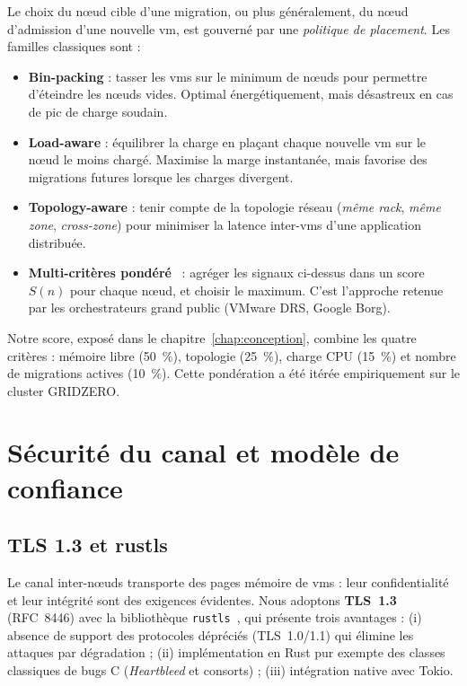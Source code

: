 Le choix du nœud cible d'une migration, ou plus généralement, du nœud d'admission d'une nouvelle \acrshort{vm}, est gouverné par une \emph{politique de placement}. Les familles classiques sont :

\begin{itemize}[leftmargin=*]
    \item \textbf{Bin-packing} : tasser les \acrshort{vm}s sur le minimum de nœuds pour permettre d'éteindre les nœuds vides. Optimal énergétiquement, mais désastreux en cas de pic de charge soudain.
    \item \textbf{Load-aware} : équilibrer la charge en plaçant chaque nouvelle \acrshort{vm} sur le nœud le moins chargé. Maximise la marge instantanée, mais favorise des migrations futures lorsque les charges divergent.
    \item \textbf{Topology-aware} : tenir compte de la topologie réseau (\emph{même rack}, \emph{même zone}, \emph{cross-zone}) pour minimiser la latence inter-\acrshort{vm}s d'une application distribuée.
    \item \textbf{Multi-critères pondéré}~\cite{gulati_2012_drs,verma_2015_borg} : agréger les signaux ci-dessus dans un score $S(n)$ pour chaque nœud, et choisir le maximum. C'est l'approche retenue par les orchestrateurs grand public (VMware DRS, Google Borg).
\end{itemize}

Notre score, exposé dans le chapitre~\ref{chap:conception}, combine les quatre critères : mémoire libre (50~\%), topologie (25~\%), charge CPU (15~\%) et nombre de migrations actives (10~\%). Cette pondération a été itérée empiriquement sur le cluster GRIDZERO.

\section{Sécurité du canal et modèle de confiance}
\label{sec:tls-tofu}

\subsection{TLS 1.3 et rustls}

Le canal inter-nœuds transporte des pages mémoire de \acrshort{vm}s : leur confidentialité et leur intégrité sont des exigences évidentes. Nous adoptons \textbf{TLS~1.3} (RFC~8446) avec la bibliothèque \texttt{rustls}~\cite{rustls_crate}, qui présente trois avantages : (i) absence de support des protocoles dépréciés (TLS~1.0/1.1) qui élimine les attaques par dégradation ; (ii) implémentation en Rust pur exempte des classes classiques de bugs C (\emph{Heartbleed} et consorts) ; (iii) intégration native avec Tokio.

